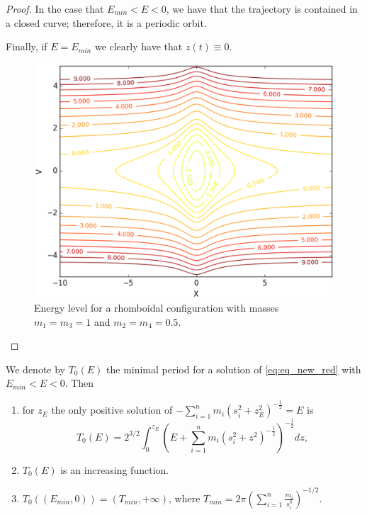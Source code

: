 \documentclass[smallcondensed]{svjour3}
\begin{document}
\begin{proof}
In the case that $E_{min}<E<0$, we have that the trajectory is contained in a closed curve; therefore, it is a periodic orbit.

Finally, if $E=E_{min}$  we clearly have that $z(t)\equiv 0$.
\begin{figure}[h]
\begin{center}
\includegraphics[scale=0.3]{figure_1.eps}
\caption{Energy level for a rhomboidal configuration with masses $m_1=m_3=1$ and $m_2=m_4=0.5$.}\label{fig:energy}
\end{center}
\end{figure}
\end{proof}

\begin{theorem}\label{thm:prop.periodos}
We denote by $T_0(E)$ the minimal period for a solution of \eqref{eq:eq_new_red} with $E_{min}<E<0$. Then
\begin{enumerate}
 \item\label{it:T0.formula} for $z_E$ the only positive solution of $-\sum_{i=1}^n m_i (s_i^2+z_{E}^2)^{-\frac12}=E$ is
 \begin{equation}\label{eq:form.T0E-periodo}
 T_0(E)=2^{3/2}\int_{0}^{z_E} \left(E+\sum_{i=1}^n m_i (s_i^2+z^2)^{-\frac12}\right)^{-\frac12} dz,
 \end{equation}
 \item\label{it:T0.creciente} $T_0(E)$ is an increasing function.
 \item\label{it:T0.rango} $T_0\left((E_{min},0)\right)=(T_{min},+\infty)$, where  $T_{min}=2\pi\left(\sum_{i=1}^n\frac{m_i}{s_i^3} \right)^{-1/2}$.

 \end{enumerate}
\end{theorem}
\end{document}
